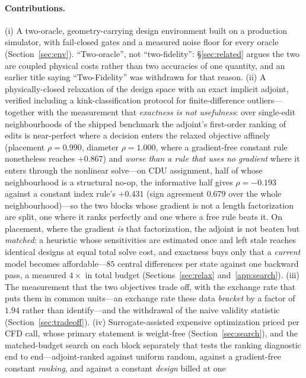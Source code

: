 \documentclass{article}
\begin{document}
\paragraph{Contributions.}
(i) A two-oracle, geometry-carrying design environment built on a production simulator,
with fail-closed gates and a measured noise floor for every oracle (Section~\ref{sec:env}).
``Two-oracle'', not ``two-fidelity'': \S\ref{sec:related} argues the two are coupled
physical costs rather than two accuracies of one quantity, and an earlier title saying
``Two-Fidelity'' was withdrawn for that reason.  (ii) A physically-closed relaxation of
the design space with an exact implicit adjoint, verified including a kink-classification
protocol for finite-difference outliers---together with the measurement that
\emph{exactness is not usefulness}: over single-edit neighbourhoods of the
shipped benchmark the adjoint's first-order ranking of edits is near-perfect where a
decision enters the relaxed objective affinely (placement $\rho = 0.990$, diameter
$\rho = 1.000$, where a gradient-free constant rule nonetheless reaches $+0.867$) and
\emph{worse than a rule that uses no gradient} where it enters through
the nonlinear solve---on CDU assignment, half of whose neighbourhood is a structural
no-op, the informative half gives $\rho = -0.193$ against a constant index rule's
$+0.431$ (sign agreement $0.679$ over the whole neighbourhood)---so the two blocks whose
gradient is not a length factorization are split, one where it ranks perfectly and one
where a free rule beats it.  On placement, where the gradient \emph{is} that factorization,
the adjoint is not beaten but \emph{matched}: a heuristic whose sensitivities are estimated
once and left stale reaches identical designs at equal total solve cost, and exactness buys
only that a \emph{current} model becomes affordable---$85$ central differences per state
against one backward pass, a measured $4\times$ in total budget
(Sections~\ref{sec:relax} and~\ref{app:search}).  (iii) The measurement
that the two objectives trade off, with the exchange rate that puts them in common
units---an exchange rate these data \emph{bracket} by a factor of $1.94$ rather than
identify---and the withdrawal of the naive validity statistic
(Section~\ref{sec:tradeoff}).  (iv) Surrogate-assisted expensive optimization priced per
CFD call, whose primary statement is weight-free (Section~\ref{sec:search}), and the
matched-budget search on each block separately that tests the ranking
diagnostic end to end---adjoint-ranked against uniform random, against a
gradient-free constant \emph{ranking}, and against a constant \emph{design} billed at one
\end{document}
